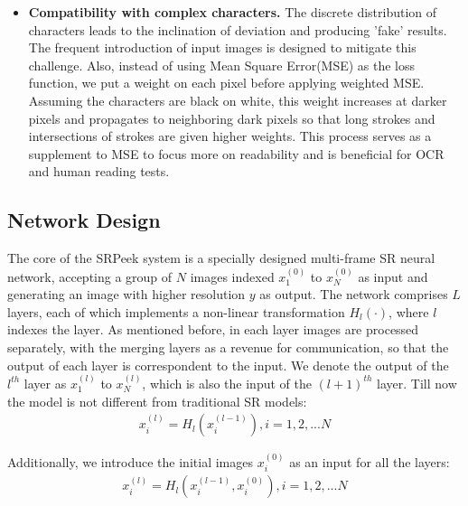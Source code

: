 \begin{itemize}[leftmargin=*]
    \item \textbf{Compatibility with complex characters.} The discrete distribution of characters leads to the inclination of deviation and producing 'fake' results. The frequent introduction of input images is designed to mitigate this challenge. Also, instead of using Mean Square Error(MSE) as the loss function, we put a weight on each pixel before applying weighted MSE. Assuming the characters are black on white, this weight increases at darker pixels and propagates to neighboring dark pixels so that long strokes and intersections of strokes are given higher weights. This process serves as a supplement to MSE to focus more on readability and is beneficial for OCR and human reading tests. 
  \end{itemize}

\subsection{Network Design}
The core of the \textsf{SRPeek} system is a specially designed multi-frame SR neural network, accepting a group of $N$ images indexed $x_1^{(0)}$ to $x_N^{(0)}$ as input and generating an image with higher resolution $y$ as output. The network comprises $L$ layers, each of which implements a non-linear transformation $H_l(\cdot)$, where $l$ indexes the layer. As mentioned before, in each layer images are processed separately, with the merging layers as a revenue for communication, so that the output of each layer is correspondent to the input.  We denote the output of the $l^{th}$ layer as $x_1^{(l)}$ to $x_N^{(l)}$, which is also the input of the $(l+1)^{th}$ layer. Till now the model is not different from traditional SR models:
\begin{equation}\label{eq:1}
    \begin{split}
x_i^{(l)} = H_l(x_i^{(l-1)}), i=1,2,...N
\end{split}
\end{equation}


Additionally, we introduce the initial images $x_i^{(0)}$ as an input for all the layers:
\begin{equation}\label{eq:2}
    \begin{split}
        x_i^{(l)} = H_l(x_i^{(l-1)},x_i^{(0)}), i=1,2,...N
\end{split}
\end{equation}

